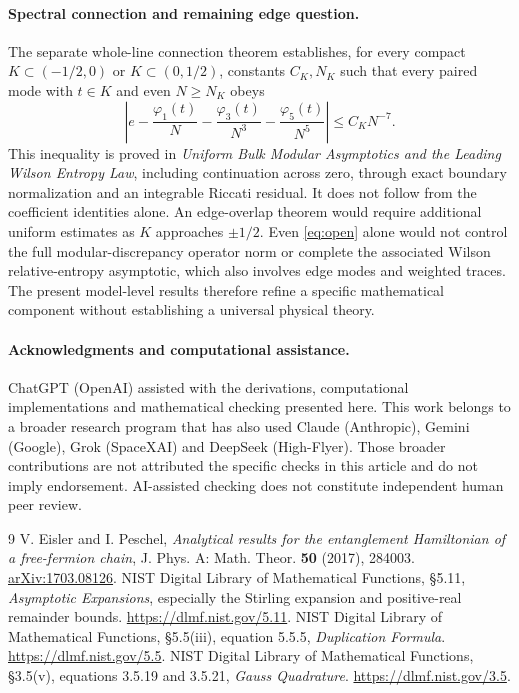 \documentclass[10pt]{article}
\newcommand{\ph}{\varphi}
\begin{document}
\paragraph{Spectral connection and remaining edge question.}
The separate whole-line connection theorem establishes, for every compact $K\subset(-1/2,0)$ or $K\subset(0,1/2)$, constants $C_K,N_K$ such that every paired mode with $t\in K$ and even $N\ge N_K$ obeys
\begin{equation}
 \left|e-\frac{\ph_1(t)}N-\frac{\ph_3(t)}{N^3}-\frac{\ph_5(t)}{N^5}\right|
 \le C_KN^{-7}.
 \label{eq:open}
\end{equation}
This inequality is proved in \emph{Uniform Bulk Modular Asymptotics and the Leading Wilson Entropy Law}, including continuation across zero, through exact boundary normalization and an integrable Riccati residual. It does not follow from the coefficient identities alone. An edge-overlap theorem would require additional uniform estimates as $K$ approaches $\pm1/2$. Even \eqref{eq:open} alone would not control the full modular-discrepancy operator norm or complete the associated Wilson relative-entropy asymptotic, which also involves edge modes and weighted traces. The present model-level results therefore refine a specific mathematical component without establishing a universal physical theory.

\paragraph{Acknowledgments and computational assistance.}
ChatGPT (OpenAI) assisted with the derivations, computational implementations and mathematical checking presented here. This work belongs to a broader research program that has also used Claude (Anthropic), Gemini (Google), Grok (SpaceXAI) and DeepSeek (High-Flyer). Those broader contributions are not attributed the specific checks in this article and do not imply endorsement. AI-assisted checking does not constitute independent human peer review.

\begin{thebibliography}{9}
 V. Eisler and I. Peschel, \emph{Analytical results for the entanglement Hamiltonian of a free-fermion chain}, J. Phys. A: Math. Theor. \textbf{50} (2017), 284003. \href{https://arxiv.org/abs/1703.08126}{arXiv:1703.08126}.
 NIST Digital Library of Mathematical Functions, \S5.11, \emph{Asymptotic Expansions}, especially the Stirling expansion and positive-real remainder bounds. \url{https://dlmf.nist.gov/5.11}.
 NIST Digital Library of Mathematical Functions, \S5.5(iii), equation 5.5.5, \emph{Duplication Formula}. \url{https://dlmf.nist.gov/5.5}.
 NIST Digital Library of Mathematical Functions, \S3.5(v), equations 3.5.19 and 3.5.21, \emph{Gauss Quadrature}. \url{https://dlmf.nist.gov/3.5}.
\end{thebibliography}
\end{document}
